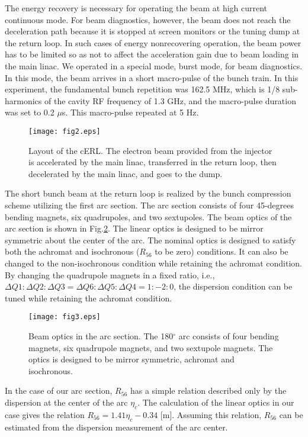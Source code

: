 \documentclass[review]{elsarticle}
\begin{document}
The energy recovery is necessary 
for operating the beam at high current continuous mode.
For beam diagnostics, however, 
the beam does not reach the deceleration path
because it is stopped at screen monitors
or the tuning dump at the return loop.
In such cases of energy nonrecovering operation,
the beam power has to be limited
so as not to affect the acceleration gain due to beam loading in the main linac.
We operated in a special mode, burst mode, for beam diagnostics.
In this mode, the beam arrives in a short macro-pulse of the bunch train.
In this experiment, 
the fundamental bunch repetition was 162.5 MHz,
which is 1/8 sub-harmonics of the cavity RF frequency of 1.3 GHz,
and the macro-pulse duration was set to 0.2 $\mu$s.
This macro-pulse repeated at 5 Hz.

\begin{figure}[htb]
	\begin{center}
	 \texttt{[image: fig2.eps]}
	  \caption{
Layout of the cERL.
The electron beam provided from the injector 
is accelerated by the main linac,
transferred in the return loop,
then decelerated by the main linac,
and goes to the dump.
}
	\label{fig:cerllayout}
\end{center}
\end{figure}



The short bunch beam at the return loop
is realized by the bunch compression scheme utilizing the first arc section.
The arc section consists of four 45-degrees bending magnets,
six quadrupoles, and two sextupoles.
The beam optics of the arc section is shown in Fig.\ref{fig:arcdesign}.
The linear optics is designed to be mirror symmetric
about the center of the arc.
The nominal optics is designed to satisfy both
the achromat and isochronous ($R_{56}$ to be zero) conditions.
It can also be changed to the non-isochronous condition
while retaining the achromat condition.
By changing the quadrupole magnets in a fixed ratio,
i.e., $\Delta Q1:\Delta Q2:\Delta Q3=\Delta Q6:\Delta Q5:\Delta Q4=1:-2:0$,
the dispersion condition can be tuned while retaining the achromat condition.

\begin{figure}[htb]
	\begin{center}
	 \texttt{[image: fig3.eps]}
	  \caption{
Beam optics in the arc section.
The 180$^{\circ}$ arc consists of four bending magnets,
six quadrupole magnets,
and two sextupole magnets.
The optics is designed to be mirror symmetric,
achromat and isochronous. 
}
	\label{fig:arcdesign}
\end{center}
\end{figure}
In the case of our arc section,
$R_{56}$ has a simple relation 
described only by the dispersion at the center of the arc $\eta_c$.
The calculation of the linear optics in our case gives the relation
$R_{56} = 1.41 \eta_c -0.34$ [m].
Assuming this relation,
$R_{56}$ can be estimated 
from the dispersion measurement of the arc center.
\end{document}

